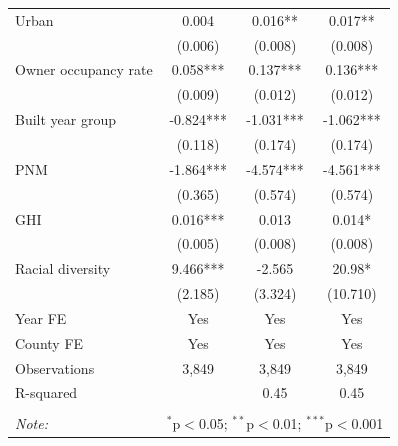 \documentclass[12pt,twoside,letterpaper]{article}
\begin{document}
\begin{table}[H]
{\begin{tabular}{lccc}
Urban & 0.004 & 0.016** & 0.017** \\
 & (0.006) & (0.008) & (0.008) \\
Owner occupancy rate & 0.058*** & 0.137*** & 0.136*** \\
 & (0.009) & (0.012) & (0.012) \\
Built year group & -0.824*** & -1.031*** & -1.062*** \\
 & (0.118) & (0.174) & (0.174) \\
PNM & -1.864*** & -4.574*** & -4.561*** \\
 & (0.365) & (0.574) & (0.574) \\
GHI & 0.016*** & 0.013 & 0.014* \\
 & (0.005) & (0.008) & (0.008) \\
Racial diversity & 9.466*** & -2.565 & 20.98* \\
 & (2.185) & (3.324) & (10.710) \\ \cline{1-4}
Year FE & Yes & Yes & Yes  \\
County FE & Yes & Yes & Yes  \\
Observations & 3,849 & 3,849 & 3,849  \\
\multicolumn{2}{l}{R-squared} & 0.45 & 0.45  \\
\hline
\hline \\[-1.8ex]
\textit{Note:} & \multicolumn{3}{r}{$^{*}$p$<$0.05; $^{**}$p$<$0.01; $^{***}$p$<$0.001} \\
\end{tabular}}
\end{table}
\end{document}
